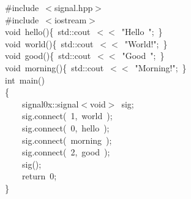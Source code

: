 \documentclass[9pt,onside,a4paper]{article}
\newcommand{\hlstd}[1]{\textcolor[rgb]{0.2,0,0.4}{#1}}
\newcommand{\hlnum}[1]{\textcolor[rgb]{0.2,0.73,0.02}{#1}}
\newcommand{\hlstr}[1]{\textcolor[rgb]{0.09,0.38,0.65}{#1}}
\newcommand{\hlppc}[1]{\textcolor[rgb]{0.33,0.45,0.69}{#1}}
\newcommand{\hlopt}[1]{\textcolor[rgb]{0.33,0.33,0.33}{#1}}
\newcommand{\hlkwa}[1]{\textcolor[rgb]{1,0.19,0.19}{#1}}
\newcommand{\hlkwb}[1]{\textcolor[rgb]{0.96,0.55,0.14}{#1}}
\newcommand{\hlkwd}[1]{\textcolor[rgb]{0.82,0.11,0.93}{#1}}
\begin{document}
\noindent
\ttfamily
\hlstd{}\hlppc{\#include\ $<$signal.hpp$>$}\hspace*{\fill}\\
\hlstd{}\hlppc{\#include\ $<$iostream$>$}\hspace*{\fill}\\
\hlstd{}\hlkwb{void\ }\hlstd{}\hlkwd{hello}\hlstd{}\hlopt{()\{\ }\hlstd{std}\hlopt{::}\hlstd{cout\ }\hlopt{$<$$<$\ }\hlstd{}\hlstr{"Hello\ "}\hlstd{}\hlopt{;\ \}}\hspace*{\fill}\\
\hlstd{}\hlkwb{void\ }\hlstd{}\hlkwd{world}\hlstd{}\hlopt{()\{\ }\hlstd{std}\hlopt{::}\hlstd{cout\ }\hlopt{$<$$<$\ }\hlstd{}\hlstr{"World!"}\hlstd{}\hlopt{;\ \}}\hspace*{\fill}\\
\hlstd{}\hlkwb{void\ }\hlstd{}\hlkwd{good}\hlstd{}\hlopt{()\{\ }\hlstd{std}\hlopt{::}\hlstd{cout\ }\hlopt{$<$$<$\ }\hlstd{}\hlstr{"Good\ "}\hlstd{}\hlopt{;\ \}}\hspace*{\fill}\\
\hlstd{}\hlkwb{void\ }\hlstd{}\hlkwd{morning}\hlstd{}\hlopt{()\{\ }\hlstd{std}\hlopt{::}\hlstd{cout\ }\hlopt{$<$$<$\ }\hlstd{}\hlstr{"Morning!"}\hlstd{}\hlopt{;\ \}}\hspace*{\fill}\\
\hlstd{}\hlkwb{int\ }\hlstd{}\hlkwd{main}\hlstd{}\hlopt{()}\hspace*{\fill}\\
\hlstd{}\hlopt{\{}\hspace*{\fill}\\
\hlstd{}\hlstd{\ \ \ \ }\hlstd{signal0x}\hlopt{::}\hlstd{signal}\hlopt{$<$}\hlstd{}\hlkwb{void}\hlstd{}\hlopt{$>$\ }\hlstd{sig}\hlopt{;}\hspace*{\fill}\\
\hlstd{}\hlstd{\ \ \ \ }\hlstd{sig}\hlopt{.}\hlstd{}\hlkwd{connect}\hlstd{}\hlopt{(\ }\hlstd{}\hlnum{1}\hlstd{}\hlopt{,\ }\hlstd{world\ }\hlopt{);}\hspace*{\fill}\\
\hlstd{}\hlstd{\ \ \ \ }\hlstd{sig}\hlopt{.}\hlstd{}\hlkwd{connect}\hlstd{}\hlopt{(\ }\hlstd{}\hlnum{0}\hlstd{}\hlopt{,\ }\hlstd{hello\ }\hlopt{);}\hspace*{\fill}\\
\hlstd{}\hlstd{\ \ \ \ }\hlstd{sig}\hlopt{.}\hlstd{}\hlkwd{connect}\hlstd{}\hlopt{(\ }\hlstd{morning\ }\hlopt{);}\hspace*{\fill}\\
\hlstd{}\hlstd{\ \ \ \ }\hlstd{sig}\hlopt{.}\hlstd{}\hlkwd{connect}\hlstd{}\hlopt{(\ }\hlstd{}\hlnum{2}\hlstd{}\hlopt{,\ }\hlstd{good\ }\hlopt{);}\hspace*{\fill}\\
\hlstd{}\hlstd{\ \ \ \ }\hlstd{}\hlkwd{sig}\hlstd{}\hlopt{();}\hspace*{\fill}\\
\hlstd{}\hlstd{\ \ \ \ }\hlstd{}\hlkwa{return\ }\hlstd{}\hlnum{0}\hlstd{}\hlopt{;}\hspace*{\fill}\\
\hlstd{}\hlopt{\}}\hlstd{}\hspace*{\fill}\\
\mbox{}
\normalfont
\normalsize
\end{document}
